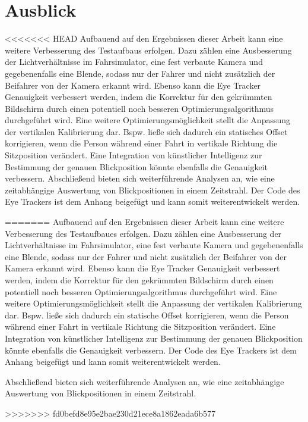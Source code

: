 \section{Ausblick}

<<<<<<< HEAD
Aufbauend auf den Ergebnissen dieser Arbeit kann eine weitere Verbesserung des Testaufbaus erfolgen. Dazu zählen eine Ausbesserung der Lichtverhältnisse im Fahrsimulator, eine fest verbaute Kamera und gegebenenfalls eine Blende, sodass nur der Fahrer und nicht zusätzlich der Beifahrer von der Kamera erkannt wird. Ebenso kann die Eye Tracker Genauigkeit verbessert werden, indem die Korrektur für den gekrümmten Bildschirm durch einen potentiell noch besseren Optimierungsalgorithmus durchgeführt wird. Eine weitere Optimierungsmöglichkeit stellt die Anpassung der vertikalen Kalibrierung dar. Bspw. ließe sich dadurch ein statisches Offset korrigieren, wenn die Person während einer Fahrt in vertikale Richtung die Sitzposition verändert. Eine Integration von künstlicher Intelligenz zur Bestimmung der genauen Blickposition könnte ebenfalls die Genauigkeit verbessern. 
Abschließend bieten sich weiterführende Analysen an, wie eine zeitabhängige Auswertung von Blickpositionen in einem Zeitstrahl. 
Der Code des Eye Trackers ist dem Anhang beigefügt und kann somit weiterentwickelt werden.

=======
Aufbauend auf den Ergebnissen dieser Arbeit kann eine weitere Verbesserung des Testaufbaues erfolgen. Dazu zählen eine Ausbesserung der Lichtverhältnisse im Fahrsimulator, eine fest verbaute Kamera und gegebenenfalls eine Blende, sodass nur der Fahrer und nicht zusätzlich der Beifahrer von der Kamera erkannt wird. Ebenso kann die Eye Tracker Genauigkeit verbessert werden, indem die Korrektur für den gekrümmten Bildschirm durch einen potentiell noch besseren Optimierungsalgorithmus durchgeführt wird. Eine weitere Optimierungsmöglichkeit stellt die Anpassung der vertikalen Kalibrierung dar. Bspw. ließe sich dadurch ein statische Offset korrigieren, wenn die Person während einer Fahrt in vertikale Richtung die Sitzposition verändert. Eine Integration von künstlicher Intelligenz zur Bestimmung der genauen Blickposition könnte ebenfalls die Genauigkeit verbessern. Der Code des Eye Trackers ist dem Anhang beigefügt und kann somit weiterentwickelt werden.

Abschließend bieten sich weiterführende Analysen an, wie eine zeitabhängige Auswertung von Blickpositionen in einem Zeitstrahl. 

>>>>>>> fd0befd8e95e2bae230d21ece8a1862eada6b577

\clearpage
